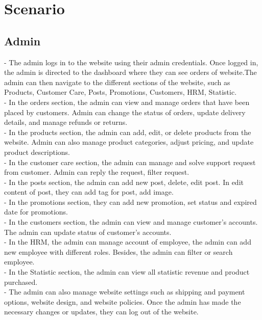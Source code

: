 \section{Scenario}
\subsection{Admin}
- The admin logs in to the website using their admin credentials. Once logged in, the admin is directed to the dashboard where they can see orders of website.The admin can then navigate to the different sections of the website, such as Products, Customer Care, Posts, Promotions, Customers, HRM, Statistic.\\
- In the orders section, the admin can view and manage orders that have been placed by customers. Admin can change the status of orders, update delivery details, and manage refunds or returns.\\
- In the products section, the admin can add, edit, or delete products from the website. Admin can also manage product categories, adjust pricing, and update product descriptions.\\
- In the customer care section, the admin can manage and solve support request from customer. Admin can reply the request, filter request.\\
- In the posts section, the admin can add new post, delete, edit post. In edit content of post, they can add tag for post, add image.\\
- In the promotions section, they can add new promotion, set status and expired date for promotions.\\
- In the customers section, the admin can view and manage customer's accounts. The admin can update status of customer's accounts.\\
- In the HRM, the admin can manage account of employee, the admin can add new employee with different roles. Besides, the admin can filter or search employee.\\
- In the Statistic section, the admin can view all statistic revenue and product purchased.\\
- The admin can also manage website settings such as shipping and payment options, website design, and website policies. Once the admin has made the necessary changes or updates, they can log out of the website.
